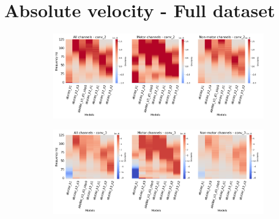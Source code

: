 \clearpage
\section*{Absolute velocity - Full dataset}\label{sec:absolute-velocity-appendixD}
\begin{figure}[!htpb]
\centering
\begin{subfigure}[b]{\textwidth}
   \includegraphics[width=1\linewidth]{img/appendix/D/conv-2/m/absVel_model_gradients_all_kinds}
   \caption{}
   \label{fig:absVel-pw-full-grads-conv-2}
\end{subfigure}

\begin{subfigure}[b]{\textwidth}
   \includegraphics[width=1\linewidth]{img/appendix/D/conv-3/m/absVel_model_gradients_all_kinds}
   \caption{}
   \label{fig:absVel-pw-full-grads-conv-3}
\end{subfigure}
\end{figure}
\clearpage   

